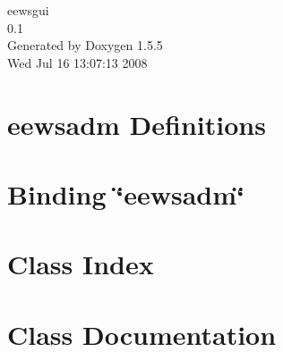 \documentclass[a4paper]{book}
\begin{document}
\begin{titlepage}
\vspace*{7cm}
\begin{center}
{\Large eewsgui \\[1ex]\large 0.1 }\\
\vspace*{1cm}
{\large Generated by Doxygen 1.5.5}\\
\vspace*{0.5cm}
{\small Wed Jul 16 13:07:13 2008}\\
\end{center}
\end{titlepage}
\clearemptydoublepage
{}
\tableofcontents
\clearemptydoublepage
{}
\chapter{eewsadm Definitions }
\label{index}
\chapter{Binding \char`\"{}eewsadm\char`\"{}}

\chapter{Class Index}

\chapter{Class Documentation}










\printindex
\end{document}

